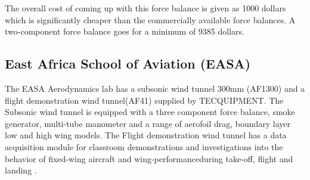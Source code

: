 The overall cost of coming up with this force balance is given as 1000 dollars which is significantly cheaper than the commercially available force balances. A two-component force balance goes for a minimum of 9385 dollars.
\subsection{East Africa School of Aviation (EASA)}
The EASA Aerodynamics lab has a subsonic wind tunnel 300mm (AF1300) and a flight demonstration wind tunnel(AF41) supplied by TECQUIPMENT. The Subsonic wind tunnel is equipped with a three component force balance, smoke generator, multi-tube manometer and a range of aerofoil drag, boundary layer low and high wing models. The Flight demonstration wind tunnel has a data acquisition module for classroom demonstrations and investigations into the behavior of fixed-wing aircraft and wing-performanceduring take-off, flight and landing \cite{TEC}.

